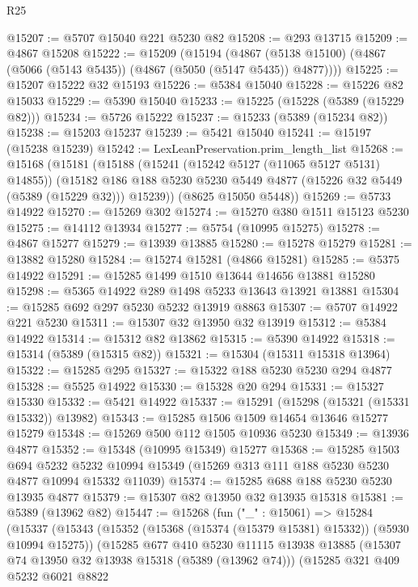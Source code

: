 \begin{lexlean}{R25}
\begin{coremodule}
@15207 := @5707 @15040 @221 @5230 @82
@15208 := @293 @13715
@15209 := @4867 @15208
@15222 := @15209
    (@15194
      (@4867 (@5138 @15100) (@4867 (@5066 (@5143 @5435)) (@4867 (@5050 (@5147 @5435)) @4877))))
@15225 := @15207 @15222 @32 @15193
@15226 := @5384 @15040
@15228 := @15226 @82 @15033
@15229 := @5390 @15040
@15233 := @15225 (@15228 (@5389 (@15229 @82)))
@15234 := @5726 @15222
@15237 := @15233 (@5389 (@15234 @82))
@15238 := @15203 @15237
@15239 := @5421 @15040
@15241 := @15197 (@15238 @15239)
@15242 := LexLeanPreservation.prim_length_list
@15268 := @15168
    (@15181
      (@15188
        (@15241 (@15242 @5127 (@11065 @5127 @5131) @14855))
        (@15182 @186 @188 @5230 @5230 @5449 @4877 (@15226 @32 @5449 (@5389 (@15229 @32))) @15239))
      (@8625 @15050 @5448))
@15269 := @5733 @14922
@15270 := @15269 @302
@15274 := @15270 @380 @1511 @15123 @5230
@15275 := @14112 @13934
@15277 := @5754 (@10995 @15275)
@15278 := @4867 @15277
@15279 := @13939 @13885
@15280 := @15278 @15279
@15281 := @13882 @15280
@15284 := @15274 @15281 (@4866 @15281)
@15285 := @5375 @14922
@15291 := @15285 @1499 @1510 @13644 @14656 @13881 @15280
@15298 := @5365 @14922 @289 @1498 @5233 @13643 @13921 @13881
@15304 := @15285 @692 @297 @5230 @5232 @13919 @8863
@15307 := @5707 @14922 @221 @5230
@15311 := @15307 @32 @13950 @32 @13919
@15312 := @5384 @14922
@15314 := @15312 @82 @13862
@15315 := @5390 @14922
@15318 := @15314 (@5389 (@15315 @82))
@15321 := @15304 (@15311 @15318 @13964)
@15322 := @15285 @295
@15327 := @15322 @188 @5230 @5230 @294 @4877
@15328 := @5525 @14922
@15330 := @15328 @20 @294
@15331 := @15327 @15330
@15332 := @5421 @14922
@15337 := @15291 (@15298 (@15321 (@15331 @15332)) @13982)
@15343 := @15285 @1506 @1509 @14654 @13646 @15277 @15279
@15348 := @15269 @500 @112 @1505 @10936 @5230
@15349 := @13936 @4877
@15352 := @15348 (@10995 @15349) @15277
@15368 := @15285
    @1503
    @694
    @5232
    @5232
    @10994
    @15349
    (@15269 @313 @111 @188 @5230 @5230 @4877 @10994 @15332 @11039)
@15374 := @15285 @688 @188 @5230 @5230 @13935 @4877
@15379 := @15307 @82 @13950 @32 @13935 @15318
@15381 := @5389 (@13962 @82)
@15447 := @15268
    (fun ("_" : @15061) =>
    @15284
      (@15337
        (@15343
          (@15352 (@15368 (@15374 (@15379 @15381) @15332)) (@5930 @10994 @15275))
          (@15285
            @677
            @410
            @5230
            @11115
            @13938
            @13885
            (@15307 @74 @13950 @32 @13938 @15318 (@5389 (@13962 @74)))
            (@15285
              @321
              @409
              @5232
              @6021
              @8822

\end{coremodule}
\end{lexlean}
